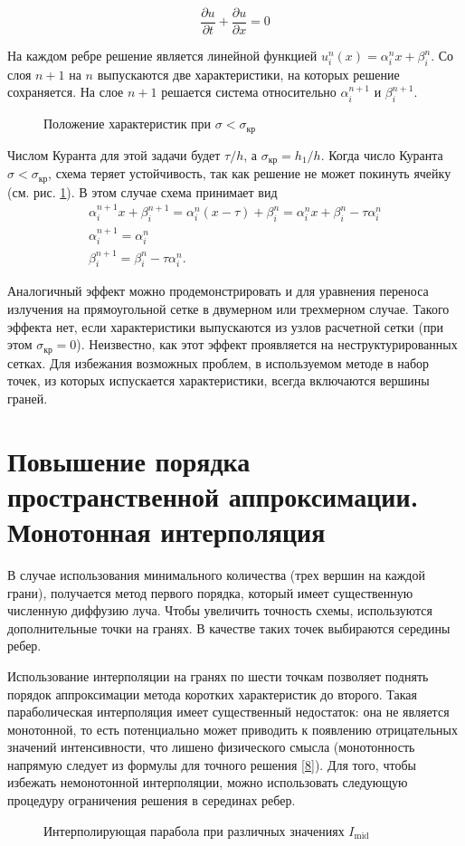 \begin {equation}
\frac{\partial u}{\partial t} + \frac{\partial u}{\partial x} = 0
\end {equation}

На каждом ребре решение является линейной функцией $u_i^n(x) = \alpha_i^nx+\beta_i^n $. Со слоя $n+1$ на $n$ выпускаются две характеристики, на которых решение сохраняется. На слое $n+1$ решается система относительно $\alpha_i^{n+1}$ и $\beta_i^{n+1}$. 

\begin{figure}[ht!]
\caption{Положение характеристик при $\sigma < \sigma_\text{кр}$}
\label{fig:5}
\end{figure}
Числом Куранта для этой задачи будет $\tau/h$, а $\sigma_\text{кр} = h_1/h$. Когда число Куранта $\sigma < \sigma_\text{кр}$, схема теряет устойчивость, так как решение не может покинуть ячейку (см. рис. \ref{fig:5}). В этом случае схема принимает вид
\begin{gather*}
\alpha^{n+1}_i x + \beta^{n+1}_i = \alpha^{n}_i (x - \tau) + \beta^{n}_i
= \alpha^{n}_i x + \beta^{n}_i - \tau \alpha_i^{n}\\
\alpha^{n+1}_i = \alpha^n_i\\
\beta^{n+1}_i = \beta^n_i - \tau \alpha^n_i.
\end{gather*}

Аналогичный эффект можно продемонстрировать и для уравнения переноса излучения на прямоугольной сетке в двумерном или трехмерном случае. Такого эффекта нет, если характеристики выпускаются из узлов расчетной сетки (при этом $\sigma_\text{кр} = 0$). Неизвестно, как этот эффект проявляется на неструктурированных сетках. Для избежания возможных проблем, в используемом методе в набор точек, из которых испускается характеристики, всегда включаются вершины граней. 
\section{Повышение порядка пространственной аппроксимации. Монотонная интерполяция}
В случае использования минимального количества (трех вершин на каждой грани), получается метод первого порядка, который имеет существенную численную диффузию луча. Чтобы увеличить точность схемы, используются дополнительные точки на гранях. В качестве таких точек выбираются середины ребер. 

Использование интерполяции на гранях по шести точкам позволяет поднять порядок аппроксимации метода коротких характеристик до второго. Такая параболическая интерполяция имеет существенный недостаток: она не является монотонной, то есть потенциально может приводить к появлению отрицательных значений интенсивности, что лишено физического смысла (монотонность напрямую следует из формулы для точного решения \eqref{8}). Для того, чтобы избежать немонотонной интерполяции, можно использовать следующую процедуру ограничения решения в серединах ребер. 
\begin{figure}[ht!]
	\caption{Интерполирующая парабола при различных значениях $I_\text{mid}$}
	\label{fig:8}
\end{figure}

